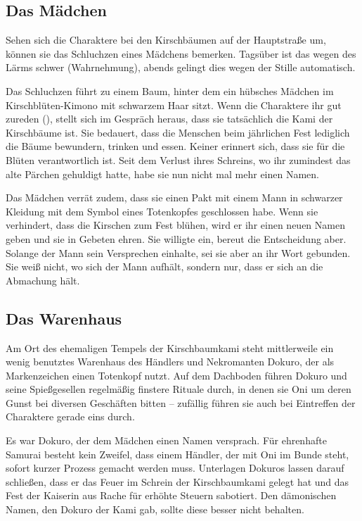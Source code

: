 {		\subsection{Das Mädchen}

			Sehen sich die Charaktere bei den Kirschbäumen auf der Hauptstraße um, können sie das Schluchzen eines Mädchens bemerken. Tagsüber ist das wegen des Lärms schwer (Wahrnehmung), abends gelingt dies wegen der Stille automatisch.

			Das Schluchzen führt zu einem Baum, hinter dem ein hübsches Mädchen im Kirschblüten-Kimono mit schwarzem Haar sitzt. Wenn die Charaktere ihr gut zureden (), stellt sich im Gespräch heraus, dass sie tatsächlich die Kami der Kirschbäume ist. Sie bedauert, dass die Menschen beim jährlichen Fest lediglich die Bäume bewundern, trinken und essen. Keiner erinnert sich, dass sie für die Blüten verantwortlich ist. Seit dem Verlust ihres Schreins, wo ihr zumindest das alte Pärchen gehuldigt hatte, habe sie nun nicht mal mehr einen Namen.

			Das Mädchen verrät zudem, dass sie einen Pakt mit einem Mann in schwarzer Kleidung mit dem Symbol eines Totenkopfes geschlossen habe. Wenn sie verhindert, dass die Kirschen zum Fest blühen, wird er ihr einen neuen Namen geben und sie in Gebeten ehren. Sie willigte ein, bereut die Entscheidung aber. Solange der Mann sein Versprechen einhalte, sei sie aber an ihr Wort gebunden. Sie weiß nicht, wo sich der Mann aufhält, sondern nur, dass er sich an die Abmachung hält.

		\subsection{Das Warenhaus}

			Am Ort des ehemaligen Tempels der Kirschbaumkami steht mittlerweile ein wenig benutztes Warenhaus des Händlers und Nekromanten Dokuro, der als Markenzeichen einen Totenkopf nutzt. Auf dem Dachboden führen Dokuro und seine Spießgesellen regelmäßig finstere Rituale durch, in denen sie Oni um deren Gunst bei diversen Geschäften bitten -- zufällig führen sie auch bei Eintreffen der Charaktere gerade eins durch.

			Es war Dokuro, der dem Mädchen einen Namen versprach. Für ehrenhafte Samurai besteht kein Zweifel, dass einem Händler, der mit Oni im Bunde steht, sofort kurzer Prozess gemacht werden muss. Unterlagen Dokuros lassen darauf schließen, dass er das Feuer im Schrein der Kirschbaumkami gelegt hat und das Fest der Kaiserin aus Rache für erhöhte Steuern sabotiert. Den dämonischen Namen, den Dokuro der Kami gab, sollte diese besser nicht behalten.

}

